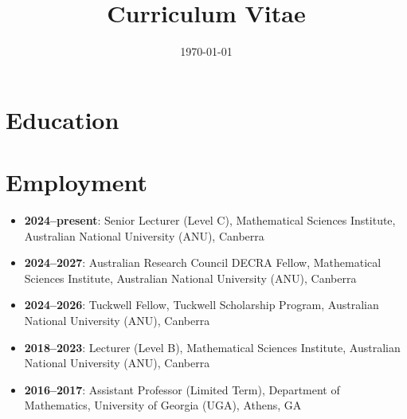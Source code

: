 \documentclass[a4paper]{moderncv}
\date{\today}
\title{Curriculum Vitae}
\begin{document}
\maketitle

\section*{Education}
\label{sec:org74e8a08}

\section*{Employment}
\label{sec:org88e5274}
\begin{itemize}
\item \textbf{2024--present}: Senior Lecturer (Level C), Mathematical Sciences Institute, Australian National University (ANU), Canberra
\item \textbf{2024--2027}: Australian Research Council DECRA Fellow, Mathematical Sciences Institute, Australian National University (ANU), Canberra
\item \textbf{2024--2026}: Tuckwell Fellow, Tuckwell Scholarship Program, Australian National University (ANU), Canberra
\item \textbf{2018--2023}: Lecturer (Level B), Mathematical Sciences Institute, Australian National University (ANU), Canberra
\item \textbf{2016--2017}: Assistant Professor (Limited Term), Department of Mathematics, University of Georgia (UGA), Athens, GA
\end{itemize}
\end{document}
